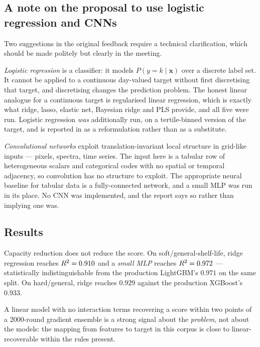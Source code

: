 \subsection{A note on the proposal to use logistic regression and CNNs}

Two suggestions in the original feedback require a technical
clarification, which should be made politely but clearly in the meeting.

\emph{Logistic regression} is a classifier: it models
$P(y = k \mid \mathbf{x})$ over a discrete label set. It cannot be applied
to a continuous day-valued target without first discretising that target,
and discretising changes the prediction problem. The honest linear
analogue for a continuous target is regularised linear regression, which is
exactly what ridge, lasso, elastic net, Bayesian ridge and PLS provide, and
all five were run. Logistic regression \emph{was} additionally run, on a
tertile-binned version of the target, and is reported in 
as a reformulation rather than as a substitute.

\emph{Convolutional networks} exploit translation-invariant local structure
in grid-like inputs --- pixels, spectra, time series. The input here is a
tabular row of heterogeneous scalars and categorical codes with no spatial
or temporal adjacency, so convolution has no structure to exploit. The
appropriate neural baseline for tabular data is a fully-connected network,
and a small MLP was run in its place. No CNN was implemented, and the
report says so rather than implying one was.

\subsection{Results}



\begin{findingbox}[title=Result of Experiment 1]
Capacity reduction does not reduce the score. On soft/general-shelf-life,
ridge regression reaches $R^2 = 0.910$ and a \emph{small MLP} reaches
$R^2 = 0.972$ --- statistically indistinguishable from the production
LightGBM's $0.971$ on the same split. On hard/general, ridge reaches
$0.929$ against the production XGBoost's $0.933$.

A linear model with no interaction terms recovering a score within two
points of a 2000-round gradient ensemble is a strong signal about the
\emph{problem}, not about the models: the mapping from features to target
in this corpus is close to linear-recoverable within the rules present.
\end{findingbox}

